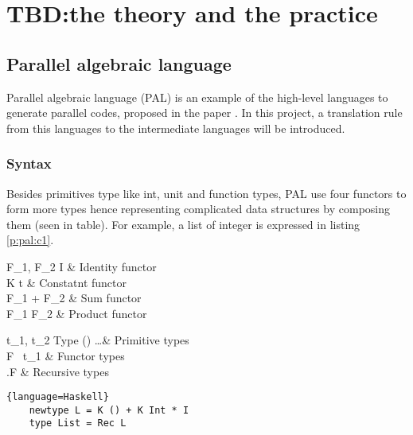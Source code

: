 \chapter{TBD:the theory and the practice}
\section{Parallel algebraic language} \label{b:pal}
Parallel algebraic language (PAL) is an example of the high-level languages to generate parallel codes, proposed in the paper \cite{authorAlgebraicMultipartyProtocol2018}. In this project, a translation rule from this languages to the intermediate languages will be introduced.
\subsection{Syntax}
Besides primitives type like int, unit and function types, PAL use four functors to form more types hence representing complicated data structures by composing them (seen in table). For example, a list of integer is expressed in listing \ref{p:pal:c1}.
\begin{table}[ht]
\begin{grammar}{F_1, F_2 \Coloneqq}{}
    I & Identity functor\\
    K t & Constatnt functor\\
    F_1 + F_2 & Sum functor\\
    F_1 \times F_2 & Product functor
\end{grammar}
\hfill
\begin{grammar}{t_1, t_2 \Coloneqq}{Type}
    () \mid {} \mid \dots & Primitive types\\
    F \ t_1 & Functor types\\
    \mu .F & Recursive types\\
\end{grammar}
\caption{Functor and Type definitions}
\end{table}
\begin{code}
\begin{lstlisting}{language=Haskell}
    newtype L = K () + K Int * I
    type List = Rec L
\end{lstlisting}
\caption{Type of integer list in PAL}
\label{p:pal:c1}
\end{code}

